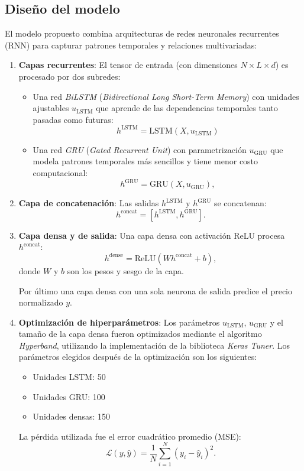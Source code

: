 \documentclass[]{article}
\begin{document}
\subsection{Diseño del modelo}
El modelo propuesto combina arquitecturas de redes neuronales recurrentes (RNN) para capturar patrones temporales y relaciones multivariadas:

\begin{enumerate}
	\item \textbf{Capas recurrentes}: El tensor de entrada (con dimensiones \(N \times L \times d\)) es procesado por dos subredes:
	\begin{itemize}
		\item Una red \textit{BiLSTM} (\textit{Bidirectional Long Short-Term Memory}) con unidades ajustables \(u_{\text{LSTM}}\) que aprende de las dependencias temporales tanto pasadas como futuras:
		\[
		h^\text{LSTM} = \text{LSTM}(X, u_\text{LSTM})
		\]
		\item Una red \textit{GRU} (\textit{Gated Recurrent Unit}) con parametrización \(u_\text{GRU}\) que modela patrones temporales más sencillos y tiene menor costo computacional:
		\[
		h^\text{GRU} = \text{GRU}(X, u_\text{GRU}),
		\]
	\end{itemize}
	
	\item \textbf{Capa de concatenación}: Las salidas \(h^\text{LSTM}\) y \(h^\text{GRU}\) se concatenan:
	\[
	h^\text{concat} = [h^\text{LSTM}, h^\text{GRU}].
	\]
	
	\item \textbf{Capa densa y de salida}: Una capa densa con activación ReLU procesa \(h^\text{concat}\):
	\[
	h^\text{dense} = \text{ReLU}(W h^\text{concat} + b),
	\]
	donde \(W\) y \(b\) son los pesos y sesgo de la capa.
	
	Por último una capa densa con una sola neurona de salida predice el precio normalizado \(y\).
	
	\item \textbf{Optimización de hiperparámetros}: Los parámetros \(u_\text{LSTM}\), \(u_\text{GRU}\) y el tamaño de la capa densa fueron optimizados mediante el algoritmo \textit{Hyperband}, utilizando la implementación de la biblioteca \textit{Keras Tuner}. Los parámetros elegidos después de la optimización son los siguientes:
	\begin{itemize}
		\item Unidades LSTM: 50
		\item Unidades GRU: 100
		\item Unidades densas: 150
	\end{itemize}
	La pérdida utilizada fue el error cuadrático promedio (MSE):
	\[
	\mathcal{L}(y, \hat{y}) = \frac{1}{N} \sum_{i=1}^N (y_i - \hat{y}_i)^2.
	\]
\end{enumerate}
\end{document}
